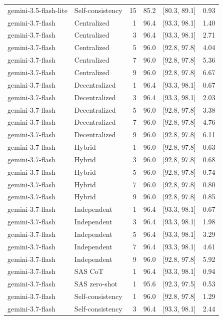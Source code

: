 \begin{tabular}{@{}llrrrr@{}}
gemini-3.5-flash-lite & Self-consistency & 15 & 85.2 & [80.3, 89.1] & 0.93 \\
gemini-3.7-flash & Centralized & 1 & 96.4 & [93.3, 98.1] & 1.40 \\
gemini-3.7-flash & Centralized & 3 & 96.4 & [93.3, 98.1] & 2.71 \\
gemini-3.7-flash & Centralized & 5 & 96.0 & [92.8, 97.8] & 4.04 \\
gemini-3.7-flash & Centralized & 7 & 96.0 & [92.8, 97.8] & 5.36 \\
gemini-3.7-flash & Centralized & 9 & 96.0 & [92.8, 97.8] & 6.67 \\
gemini-3.7-flash & Decentralized & 1 & 96.4 & [93.3, 98.1] & 0.67 \\
gemini-3.7-flash & Decentralized & 3 & 96.4 & [93.3, 98.1] & 2.03 \\
gemini-3.7-flash & Decentralized & 5 & 96.0 & [92.8, 97.8] & 3.38 \\
gemini-3.7-flash & Decentralized & 7 & 96.0 & [92.8, 97.8] & 4.76 \\
gemini-3.7-flash & Decentralized & 9 & 96.0 & [92.8, 97.8] & 6.11 \\
gemini-3.7-flash & Hybrid & 1 & 96.0 & [92.8, 97.8] & 0.63 \\
gemini-3.7-flash & Hybrid & 3 & 96.0 & [92.8, 97.8] & 0.68 \\
gemini-3.7-flash & Hybrid & 5 & 96.0 & [92.8, 97.8] & 0.74 \\
gemini-3.7-flash & Hybrid & 7 & 96.0 & [92.8, 97.8] & 0.80 \\
gemini-3.7-flash & Hybrid & 9 & 96.0 & [92.8, 97.8] & 0.85 \\
gemini-3.7-flash & Independent & 1 & 96.4 & [93.3, 98.1] & 0.67 \\
gemini-3.7-flash & Independent & 3 & 96.4 & [93.3, 98.1] & 1.98 \\
gemini-3.7-flash & Independent & 5 & 96.4 & [93.3, 98.1] & 3.29 \\
gemini-3.7-flash & Independent & 7 & 96.4 & [93.3, 98.1] & 4.61 \\
gemini-3.7-flash & Independent & 9 & 96.0 & [92.8, 97.8] & 5.92 \\
gemini-3.7-flash & SAS CoT & 1 & 96.4 & [93.3, 98.1] & 0.94 \\
gemini-3.7-flash & SAS zero-shot & 1 & 95.6 & [92.3, 97.5] & 0.53 \\
gemini-3.7-flash & Self-consistency & 1 & 96.0 & [92.8, 97.8] & 1.29 \\
gemini-3.7-flash & Self-consistency & 3 & 96.4 & [93.3, 98.1] & 2.44 \\

\end{tabular}
